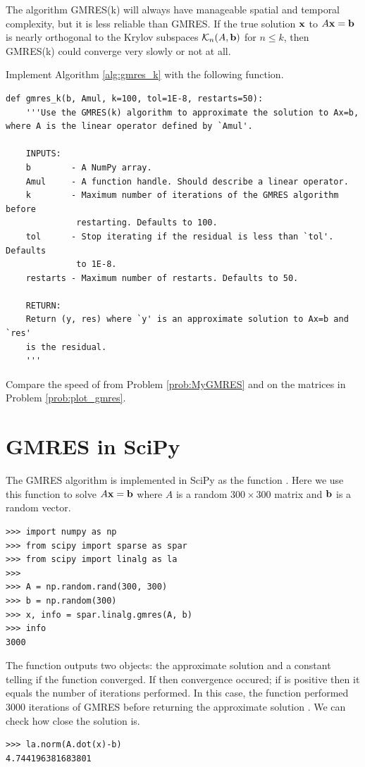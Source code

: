 The algorithm GMRES(k) will always have manageable spatial and temporal complexity, but it is less reliable than GMRES.
If the true solution ${\bf x}$ to $A{\bf x}={\bf b}$ is nearly orthogonal to the Krylov subspaces $\mathcal{K}_n(A, {\bf b})$ for $n\leq k$, then GMRES(k) could converge very slowly or not at all.

\begin{problem}
Implement Algorithm \ref{alg:gmres_k} with the following function.
\begin{lstlisting}
def gmres_k(b, Amul, k=100, tol=1E-8, restarts=50):
    '''Use the GMRES(k) algorithm to approximate the solution to Ax=b, where A is the linear operator defined by `Amul'.
    
    INPUTS:
    b        - A NumPy array.
    Amul     - A function handle. Should describe a linear operator.
    k        - Maximum number of iterations of the GMRES algorithm before 
              restarting. Defaults to 100.
    tol      - Stop iterating if the residual is less than `tol'. Defaults 
              to 1E-8.
    restarts - Maximum number of restarts. Defaults to 50.
    
    RETURN:
    Return (y, res) where `y' is an approximate solution to Ax=b and `res' 
    is the residual.
    '''
\end{lstlisting}

Compare the speed of  from Problem \ref{prob:MyGMRES} and  on the matrices in Problem \ref{prob:plot_gmres}.
\label{prob:GMRES3}
\end{problem}

\section*{GMRES in SciPy}
The GMRES algorithm is implemented in SciPy as the function .
Here we use this function to solve $A{\bf x}={\bf b}$ where $A$ is a random $300 \times 300$ matrix and ${\bf b}$ is a random vector.

\begin{lstlisting}
>>> import numpy as np
>>> from scipy import sparse as spar
>>> from scipy import linalg as la
>>>
>>> A = np.random.rand(300, 300)
>>> b = np.random(300)
>>> x, info = spar.linalg.gmres(A, b)
>>> info
3000
\end{lstlisting}

The function outputs two objects: the approximate solution  and a constant  telling if the function converged.
If  then convergence occured; if  is positive then it equals the number of iterations performed.
In this case, the function performed 3000 iterations of GMRES before returning the approximate solution .
We can check how close the solution is.
\begin{lstlisting}
>>> la.norm(A.dot(x)-b)
4.744196381683801
\end{lstlisting}

